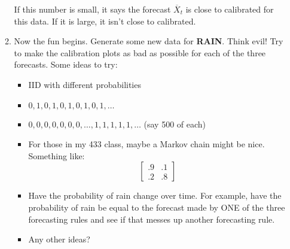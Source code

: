 \documentclass[11pt]{article}
\begin{document}
\begin{enumerate}
\begin{enumerate}
\begin{displaymath}
\end{displaymath}
If this number is small, it says the forecast $\overline{X}_t$ is
close to calibrated for this data.  If it is large, it isn't close to
calibrated. 
\item Now the fun begins.  Generate some new data for {\bf RAIN}.
Think evil!  Try to make the calibration plots as bad as possible for
each of the three forecasts.  Some ideas to try:
\begin{itemize}
\item IID with different probabilities
\item $0,1,0,1,0,1,0,1,0,1,\ldots$
\item $0,0,0,0,0,0,0,\ldots,1,1,1,1,1,\ldots$ (say 500 of each)
\item For those in my 433 class, maybe a Markov chain might be
nice. Something like:
\begin{displaymath}
\left[\begin{array}{cc}.9 &.1\\.2 & .8
\end{array}
\right]
\end{displaymath}
\item Have the probability of rain change over time.  For example,
have the probability of rain be equal to the forecast made by ONE of
the three forecasting rules and see if that messes up another
forecasting rule.
\item Any other ideas?
\end{itemize}
\end{enumerate}


\end{enumerate}
\end{document}
